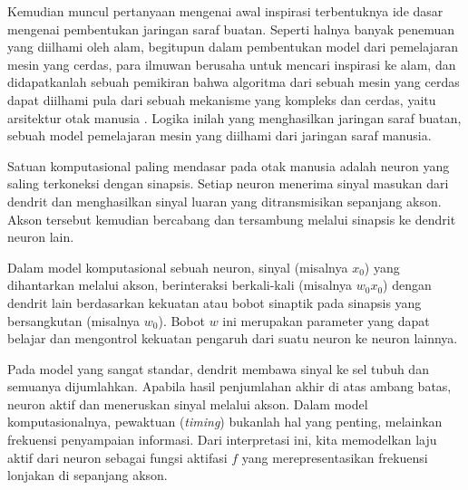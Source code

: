 Kemudian muncul pertanyaan mengenai awal inspirasi terbentuknya ide dasar mengenai pembentukan jaringan saraf buatan. Seperti halnya banyak penemuan yang diilhami oleh alam, begitupun dalam pembentukan model dari pemelajaran mesin yang cerdas, para ilmuwan berusaha untuk mencari inspirasi ke alam, dan didapatkanlah sebuah pemikiran bahwa algoritma dari sebuah mesin yang cerdas dapat diilhami pula dari sebuah mekanisme yang kompleks dan cerdas, yaitu arsitektur otak manusia \citep{aurélien_géron_2022}. Logika inilah yang menghasilkan jaringan saraf buatan, sebuah model pemelajaran mesin yang diilhami dari jaringan saraf manusia. 

Satuan komputasional paling mendasar pada otak manusia adalah neuron yang saling terkoneksi dengan sinapsis. Setiap neuron menerima sinyal masukan dari dendrit dan menghasilkan sinyal luaran yang ditransmisikan sepanjang akson. Akson tersebut kemudian bercabang dan tersambung melalui sinapsis ke dendrit neuron lain. 

Dalam model komputasional sebuah neuron, sinyal (misalnya $x_0$) yang dihantarkan melalui akson, berinteraksi berkali-kali (misalnya $w_0 x_0$) dengan dendrit lain berdasarkan kekuatan atau bobot sinaptik pada sinapsis yang bersangkutan (misalnya $w_0$). Bobot $w$ ini merupakan parameter yang dapat belajar dan mengontrol kekuatan pengaruh dari suatu neuron ke neuron lainnya.

Pada model yang sangat standar, dendrit membawa sinyal ke sel tubuh dan semuanya dijumlahkan. Apabila hasil penjumlahan akhir di atas ambang batas, neuron aktif dan meneruskan sinyal melalui akson. Dalam model komputasionalnya, pewaktuan (\emph{timing}) bukanlah hal yang penting, melainkan frekuensi penyampaian informasi. Dari interpretasi ini, kita memodelkan laju aktif dari neuron sebagai fungsi aktifasi $f$ yang merepresentasikan frekuensi lonjakan di sepanjang akson.

